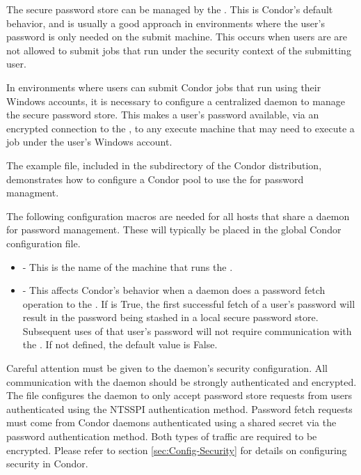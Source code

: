 The secure password store can be managed by the .  This
is Condor's default behavior, and is usually a good approach in
environments where the user's password is only needed on the
submit machine.
This occurs when users are are not allowed to
submit jobs that run under the security context of the submitting
user.

In environments where users can submit Condor jobs that run using
their Windows accounts, it is necessary to configure a centralized
 daemon to manage the secure password store.  This makes a
user's password available, via an encrypted connection to the
, to any execute machine that may need to execute a job
under the user's Windows account.

The  example file, included in the
 subdirectory of the Condor distribution, demonstrates how
to configure a Condor pool to use the  for password
managment.

The following configuration macros are needed for all hosts that share
a  daemon for password management.  These will typically be
placed in the global Condor configuration file.
\begin{itemize}
\item {} - This is the name of the machine that runs
      the .
\item {} - This affects Condor's behavior
      when a daemon does a password fetch operation to the
      . If  is True, the
      first successful fetch of a user's password will result in the
      password being stashed in a local secure password
      store. Subsequent uses of that user's password will not require
      communication with the .  If not defined, the default
      value is False.
\end{itemize}

Careful attention must be given to the  daemon's security
configuration.  All communication with the  daemon should be
strongly authenticated and encrypted.  The
 file configures the 
daemon
to only accept password store requests from users authenticated
using the NTSSPI authentication method.  Password fetch requests must
come from Condor daemons authenticated using a shared secret via the
password authentication method.  Both types of traffic are required to
be encrypted.  Please refer to section \ref{sec:Config-Security} for
details on configuring security in Condor.

